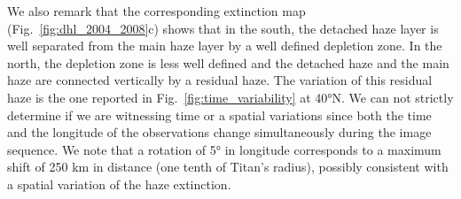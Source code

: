 We also remark that the corresponding extinction map (Fig.~\ref{fig:dhl_2004_2008}c) shows that in the south,
the detached haze layer is well separated from the main haze layer by a well defined depletion zone. In the north, the depletion
zone is less well defined and the detached haze and the main haze are connected vertically by a residual haze.
The variation of this residual haze is the one reported in Fig.~\ref{fig:time_variability} at \ang{40}N.
We can not strictly determine if we are witnessing time or a spatial variations since both the time and the longitude
of the observations change simultaneously during the image sequence. We note that a rotation of \ang{5} in longitude
corresponds to a maximum shift of 250 km in distance (one tenth of Titan's radius), possibly consistent with a spatial
variation of the haze extinction.
